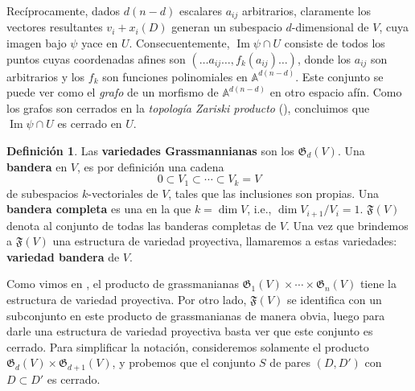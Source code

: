 \documentclass[spanish,12pt]{amsart}
\theoremstyle{definition}
\newtheorem{definition}[theorem]{Definición}
\theoremstyle{remark}
\numberwithin{equation}{section}
\newcommand{\afine}[1]{\mathbb{A}^{#1}}
\newcommand{\Imagen}{\operatorname{Im}}
\begin{document}
Recíprocamente, dados $d (n-d)$ escalares $a_{ij}$ arbitrarios, claramente los vectores resultantes $v_i + x_i (D)$ generan un subespacio $d$-dimensional de $V$, cuya imagen bajo $\psi$ yace en $U$. Consecuentemente, $\Imagen \psi \cap U$ consiste de todos los puntos cuyas coordenadas afines son $(\ldots a_{ij} \ldots, f_k (a_{ij}) \ldots)$, donde los $a_{ij}$ son arbitrarios y los $f_k$ son funciones polinomiales en $\afine {d (n-d)}$. Este conjunto se puede ver como el \textit{grafo} de un morfismo de $\afine{d (n-d)}$ en otro espacio afín. Como los grafos son cerrados en la \textit{topología Zariski producto} (\cite[Teorema 2.6.12]{notas_pedro}), concluimos que $\Imagen \psi \cap U$ es cerrado en $U$.

\begin{definition}
Las \textbf{variedades Grassmannianas} son los $\mathfrak G _d (V)$. Una \textbf{bandera} en $V$, es por definición una cadena
\[
    0 \subset V_1 \subset \cdots \subset V_k = V
\]
de subespacios $k$-vectoriales de $V$, tales que las inclusiones son propias. Una \textbf{bandera completa} es una en la que $k = \dim V$, i.e., $\dim V_{i+1}/V_i = 1$. $\mathfrak F (V)$ denota al conjunto de todas las banderas completas de $V$. Una vez que brindemos a $\mathfrak F (V)$ una estructura de variedad proyectiva, llamaremos a estas variedades: \textbf{variedad bandera} de $V$.
\end{definition}


Como vimos en \cite[Corolario 2.7.17]{notas_pedro}, el producto de grassmanianas $\mathfrak G_1 (V) \times \cdots \times \mathfrak G_n (V)$ tiene la estructura de variedad proyectiva. Por otro lado, $\mathfrak F (V)$ se identifica con un subconjunto en este producto de grassmanianas de manera obvia, luego para darle una estructura de variedad proyectiva basta ver que este conjunto es cerrado. Para simplificar la notación, consideremos solamente el producto $\mathfrak G _d (V) \times \mathfrak G_{d+1} (V)$, y probemos que el conjunto $S$ de pares $(D, D')$ con $D \subset D'$ es cerrado.
\end{document}
